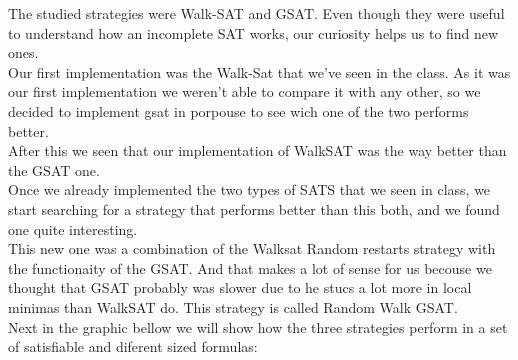 
The studied strategies were Walk-SAT and GSAT. Even though they were useful to understand how an incomplete SAT works, our curiosity helps us to find new ones.\\
Our first implementation was the Walk-Sat that we've seen in the class. As it was our first implementation we weren't able to compare it with any other, so we decided to implement gsat in porpouse to see wich one of the two performs better.\\
After this we seen that our implementation of WalkSAT was the way better than the GSAT one.\\
Once we already implemented the two types of SATS that we seen in class, we start searching for a strategy that performs better than this both, and we found one quite interesting.\\
This new one was a combination of the Walksat Random restarts strategy with the functionaity of the GSAT. And that makes a lot of sense for us becouse we thought that GSAT probably was slower due to he stucs a lot more in local minimas than WalkSAT do. This strategy is called Random Walk GSAT.\\
Next in the graphic bellow we will show how the three strategies perform in a set of satisfiable and diferent sized formulas:

